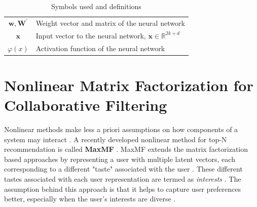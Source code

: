 \begin{table}[p]
\begin{center}
\begin{tabularx}{\linewidth}{cX}
			$\mathbf{w}, \mathbf{W^\prime}$ & Weight vector and matrix of the neural network \\
			$\mathbf{x}$ & Input vector to the neural network, $\mathbf{x} \in \mathds{R}^{2k + d}$ \\
			$\varphi(x)$ & Activation function of the neural network \\
			\hline \hline
		\end{tabularx}
	\end{center}
	\caption{Symbols used and definitions}
	\label{tab:symbols}
\end{table}

\section{Nonlinear Matrix Factorization for Collaborative Filtering}
\label{st:mpcf}

Nonlinear methods make less a priori assumptions on how components of a system may interact \cite{Carello2005}.
A recently developed nonlinear method for top-N recommendation is called \textbf{MaxMF} \cite{Weston2013}.
MaxMF extends the matrix factorization based approaches by representing a user with multiple latent vectors, each corresponding to a different "taste" associated with the user \cite{Kabbur2015}.
These different tastes associated with each user representation are termed as \textit{interests} \cite{Kabbur2015}.
The assumption behind this approach is that it helps to capture user preferences better, especially when the user's interests are diverse \cite{Kabbur2015}.

